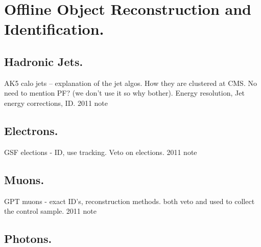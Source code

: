 \chapter{Offline Object Reconstruction and Identification.} %
\label{cha:offline_object_deffinitions}

\section{Hadronic Jets.} %
\label{sec:hadronic_jets}
AK5 calo jets -- explanation of the jet algos. How they are clustered at CMS.
No need to mention PF? (we don't use it so why bother). Energy resolution, Jet 
energy corrections, ID. 2011 note



\section{Electrons.} %
\label{sec:electrons}
GSF elections - ID, use tracking. Veto on elections. 2011 note

\section{Muons.} %
\label{sec:muons}
GPT muons - exact ID's, reconstruction methods. both veto and used to collect 
the control sample. 2011 note

\section{Photons.} %
\label{sec:photons}




